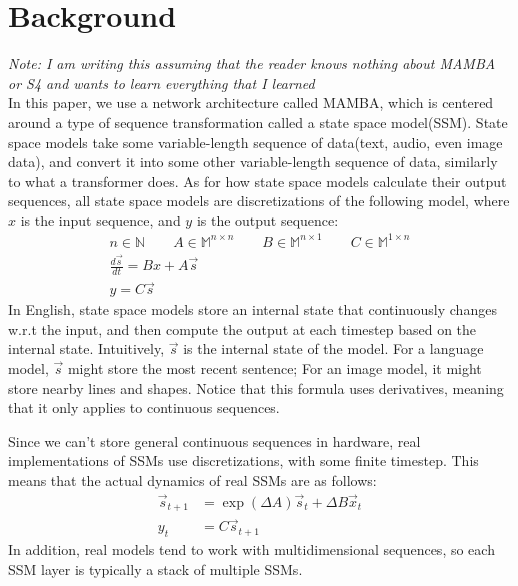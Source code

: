 \providecommand\NN{{\mathbb N}}
\providecommand\MM{{\mathbb M}}

\section{Background}
\textit{Note: I am writing this assuming that the reader knows nothing about
MAMBA or S4 and wants to learn everything that I learned}\\

In this paper, we use a network architecture called MAMBA, which is centered
around a type of sequence transformation called a state space model(SSM).
State space models take some variable-length sequence of data(text, audio, even
image data), and convert it into some other variable-length sequence of data,
similarly to what a transformer does.
As for how state space models calculate their output sequences, all state space
models are discretizations of the following model, where $x$ is the input
sequence, and $y$ is the output sequence:
$$\begin{aligned}
    n \in \NN \qquad
    A \in \MM^{n \times n} \qquad
    B \in \MM^{n \times 1} \qquad
    C \in \MM^{1 \times n} \\
    \frac{d\vec{s}}{dt} = Bx + A\vec{s}\\
    y = C\vec{s}
\end{aligned}$$
In English, state space models store an internal state that continuously changes
w.r.t the input, and then compute the output at each timestep based on the
internal state.
Intuitively, $\vec{s}$ is the internal state of the model.
For a language model, $\vec{s}$ might store the most recent sentence; For an
image model, it might store nearby lines and shapes.
Notice that this formula uses derivatives, meaning that it only applies to
continuous sequences.

Since we can't store general continuous sequences in hardware, real
implementations of SSMs use discretizations, with some finite timestep.
This means that the actual dynamics of real SSMs are as follows:
$$\begin{aligned}
    \vec{s}_{t+1} &= \exp(\Delta A)\vec{s}_{t} + \Delta B \vec x_{t} \\
    y_{t} &= C \vec{s}_{t+1}
\end{aligned}$$
In addition, real models tend to work with multidimensional sequences, so each
SSM layer is typically a stack of multiple SSMs.
